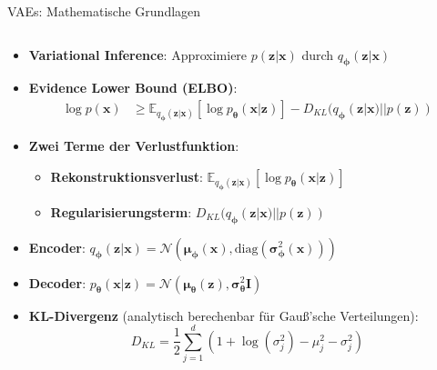 \documentclass[aspectratio=1610, xcolor=dvipsnames, 9pt]{beamer}
\begin{document}
\begin{frame}{VAEs: Mathematische Grundlagen}
  \begin{columns}
    \begin{column}{1\textwidth}
      \begin{itemize}
        \item \textbf{Variational Inference}: Approximiere $p(\mathbf{z}|\mathbf{x})$ durch $q_{\boldsymbol{\phi}}(\mathbf{z}|\mathbf{x})$
        \item \textbf{Evidence Lower Bound (ELBO)}:
        \begin{align}
          \log p(\mathbf{x}) &\geq \mathbb{E}_{q_{\boldsymbol{\phi}}(\mathbf{z}|\mathbf{x})}[\log p_{\boldsymbol{\theta}}(\mathbf{x}|\mathbf{z})] - D_{KL}(q_{\boldsymbol{\phi}}(\mathbf{z}|\mathbf{x}) || p(\mathbf{z}))
        \end{align}
        \item \textbf{Zwei Terme der Verlustfunktion}:
        \begin{itemize}
          \item \textbf{Rekonstruktionsverlust}: $\mathbb{E}_{q_{\boldsymbol{\phi}}(\mathbf{z}|\mathbf{x})}[\log p_{\boldsymbol{\theta}}(\mathbf{x}|\mathbf{z})]$
          \item \textbf{Regularisierungsterm}: $D_{KL}(q_{\boldsymbol{\phi}}(\mathbf{z}|\mathbf{x}) || p(\mathbf{z}))$
        \end{itemize}
        \item \textbf{Encoder}: $q_{\boldsymbol{\phi}}(\mathbf{z}|\mathbf{x}) = \mathcal{N}(\boldsymbol{\mu}_{\boldsymbol{\phi}}(\mathbf{x}), \text{diag}(\boldsymbol{\sigma}_{\boldsymbol{\phi}}^2(\mathbf{x})))$
        \item \textbf{Decoder}: $p_{\boldsymbol{\theta}}(\mathbf{x}|\mathbf{z}) = \mathcal{N}(\boldsymbol{\mu}_{\boldsymbol{\theta}}(\mathbf{z}), \boldsymbol{\sigma}_{\boldsymbol{\theta}}^2 \mathbf{I})$
        \item \textbf{KL-Divergenz} (analytisch berechenbar für Gauß'sche Verteilungen):
        \begin{equation}
          D_{KL} = \frac{1}{2} \sum_{j=1}^{d} (1 + \log(\sigma_j^2) - \mu_j^2 - \sigma_j^2)
        \end{equation}
      \end{itemize}
    \end{column}
  \end{columns}
\end{frame}
\end{document}
